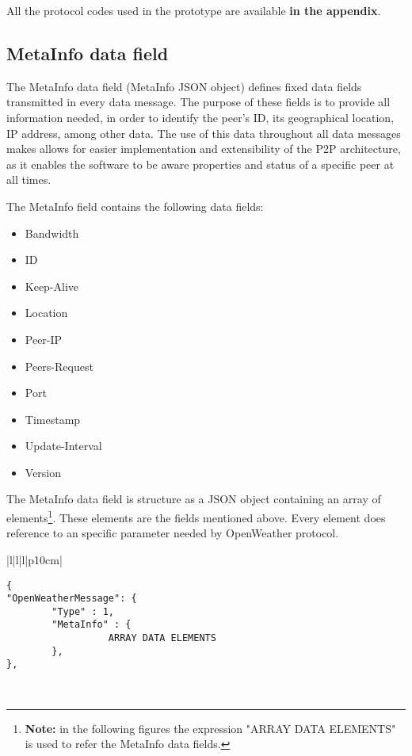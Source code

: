 All the protocol codes used in the prototype are available \textbf{in the appendix}.

\subsection{MetaInfo data field}\label{header}

The MetaInfo data field (MetaInfo \gls{JSON} object) defines fixed data fields transmitted in every data message. The purpose of these fields is to provide all information needed, in order to identify the peer's ID, its geographical location, \gls{IP} address, among other data. The use of this data throughout all data messages makes allows for easier implementation and extensibility of the \gls{P2P} architecture,  as it enables the software to be aware properties and status of a specific peer at all times.

The MetaInfo field contains the following data fields:

\begin{itemize}
\item Bandwidth
\item ID
\item Keep-Alive
\item Location
\item Peer-IP 
\item Peers-Request
\item Port
\item Timestamp 
\item Update-Interval
\item Version
\end{itemize}

The MetaInfo data field is structure as a \gls{JSON} object containing an array of elements\footnote{\textbf{Note:} in the following figures the expression "ARRAY DATA ELEMENTS" is used to refer the MetaInfo data fields.}. These elements are the fields mentioned above. Every element does reference to an specific parameter needed by OpenWeather protocol.

\begin{table}[H]
\centering
\begin{tabular}{|l|l|l|p{10cm}|}
\hline
\begin{minipage}[t]{\linewidth}
	\begin{verbatim}
{
"OpenWeatherMessage": {
        "Type" : 1,
        "MetaInfo" : {
	              ARRAY DATA ELEMENTS
        },
},
      \end{verbatim}
\end{minipage} \\
\hline
\end{tabular}
\caption{MetaInfo field in a data message of OpenWeather protocol.}
\end{table}

